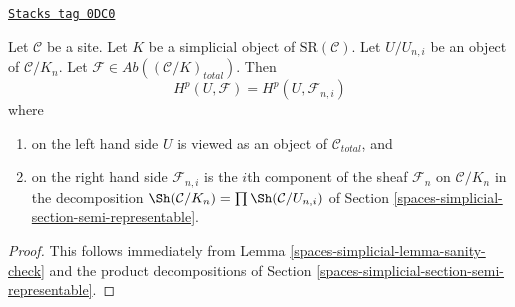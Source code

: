 \begin{lemma}
\label{spaces-simplicial-lemma-sanity-check-simplicial-semi-representable}
\href{https://stacks.math.columbia.edu/tag/0DC0}{\texttt{Stacks tag 0DC0}}

Let $\mathcal{C}$ be a site. Let $K$ be a simplicial object of
$\text{SR}(\mathcal{C})$. Let $U/U_{n, i}$ be an object of
$\mathcal{C}/K_n$. Let
$\mathcal{F} \in \textit{Ab}((\mathcal{C}/K)_{total})$.
Then
$$
H^p(U, \mathcal{F}) = H^p(U, \mathcal{F}_{n, i})
$$
where
\begin{enumerate}
\item on the left hand side $U$ is viewed as an object of
$\mathcal{C}_{total}$, and
\item on the right hand side $\mathcal{F}_{n, i}$ is the $i$th
component of the sheaf $\mathcal{F}_n$ on $\mathcal{C}/K_n$
in the decomposition $\Sh(\mathcal{C}/K_n) = \prod \Sh(\mathcal{C}/U_{n, i})$
of Section \ref{spaces-simplicial-section-semi-representable}.
\end{enumerate}
\end{lemma}

\begin{proof}
This follows immediately from Lemma \ref{spaces-simplicial-lemma-sanity-check}
and the product decompositions of Section \ref{spaces-simplicial-section-semi-representable}.
\end{proof}

